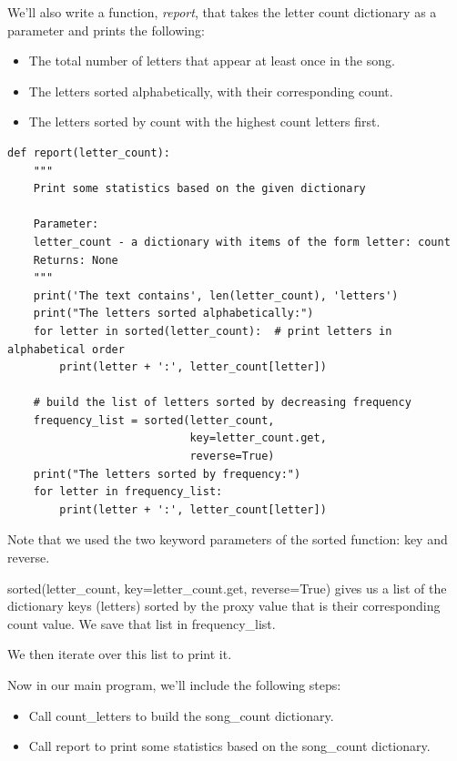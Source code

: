 \documentclass{article}
\begin{document}
We'll also write a function, \textit{report}, that takes the letter count dictionary as a parameter and prints the following:

\begin{itemize}
\item The total number of letters that appear at least once in the song.
\item The letters sorted alphabetically, with their corresponding count.
\item The letters sorted by count with the highest count letters first.
\end{itemize}

\begin{lstlisting}
def report(letter_count):
    """
    Print some statistics based on the given dictionary

    Parameter: 
    letter_count - a dictionary with items of the form letter: count
    Returns: None
    """
    print('The text contains', len(letter_count), 'letters')
    print("The letters sorted alphabetically:")
    for letter in sorted(letter_count):  # print letters in alphabetical order
        print(letter + ':', letter_count[letter])

    # build the list of letters sorted by decreasing frequency
    frequency_list = sorted(letter_count,
                            key=letter_count.get,
                            reverse=True)
    print("The letters sorted by frequency:")
    for letter in frequency_list:
        print(letter + ':', letter_count[letter])
\end{lstlisting}
        
Note that we used the two keyword parameters of the sorted function:  key and reverse.  

sorted(letter{\_}count, key=letter{\_}count.get, reverse=True) gives us a list of the dictionary keys (letters) sorted by the proxy value that is their corresponding count value.  We save that list in frequency{{\_}}list.

We then iterate over this list to print it.

Now in our main program, we'll include the following steps:
\begin{itemize}
\item Call count{\_}letters to build the song{\_}count dictionary.
\item Call report to print some statistics based on the song{\_}count dictionary.
\end{itemize}
\end{document}
